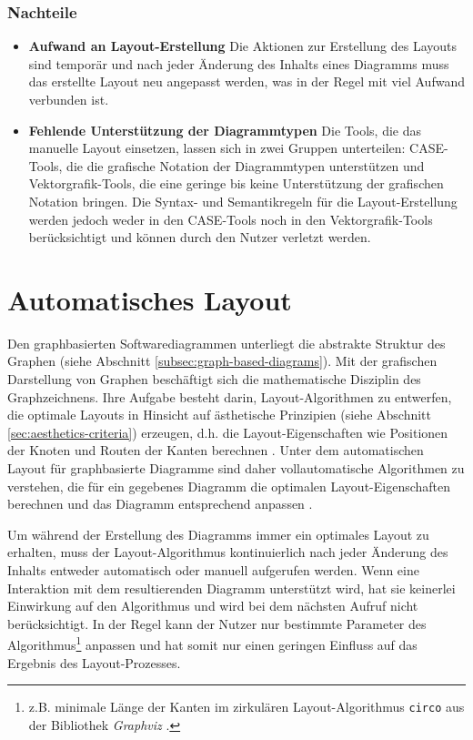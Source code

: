 \subsubsection{Nachteile}

\begin{itemize}

\item
\textbf{Aufwand an Layout-Erstellung}
Die Aktionen zur Erstellung des Layouts sind temporär und nach jeder Änderung des Inhalts eines Diagramms muss das erstellte Layout neu angepasst werden, was in der Regel mit viel Aufwand verbunden ist.

\item
\textbf{Fehlende Unterstützung der Diagrammtypen}
Die Tools, die das manuelle Layout einsetzen, lassen sich in zwei Gruppen unterteilen: CASE-Tools, die die grafische Notation der Diagrammtypen unterstützen und Vektorgrafik-Tools, die eine geringe bis keine Unterstützung der grafischen Notation bringen. Die Syntax- und Semantikregeln für die Layout-Erstellung werden jedoch weder in den CASE-Tools noch in den Vektorgrafik-Tools berücksichtigt und können durch den Nutzer verletzt werden.

\end{itemize}

\section{Automatisches Layout}
\label{sec:automatic-layout}

Den graphbasierten Softwarediagrammen unterliegt die abstrakte Struktur des Graphen (siehe Abschnitt \ref{subsec:graph-based-diagrams}). Mit der grafischen Darstellung von Graphen beschäftigt sich die mathematische Disziplin des Graphzeichnens. Ihre Aufgabe besteht darin, Layout-Algorithmen zu entwerfen, die optimale Layouts in Hinsicht auf ästhetische Prinzipien (siehe Abschnitt \ref{sec:aesthetics-criteria}) erzeugen, d.h. die Layout-Eigenschaften wie Positionen der Knoten und Routen der Kanten berechnen \cite{Eichelberger05Aesthetics, Arvo02Techniques, Siebenhaller03Automatisches, Maier12A-Pattern-based}. Unter dem automatischen Layout für graphbasierte Diagramme sind daher vollautomatische Algorithmen zu verstehen, die für ein gegebenes Diagramm die optimalen Layout-Eigenschaften berechnen und das Diagramm entsprechend anpassen \cite{Fuhrmann11On-the-Pragmatics}.

Um während der Erstellung des Diagramms immer ein optimales Layout zu erhalten, muss der Layout-Algorithmus kontinuierlich nach jeder Änderung des Inhalts entweder automatisch oder manuell aufgerufen werden. Wenn eine Interaktion mit dem resultierenden Diagramm unterstützt wird, hat sie keinerlei Einwirkung auf den Algorithmus und wird bei dem nächsten Aufruf nicht berücksichtigt. In der Regel kann der Nutzer nur bestimmte Parameter des Algorithmus\footnote{z.B. minimale Länge der Kanten im zirkulären Layout-Algorithmus \texttt{circo} aus der Bibliothek \textit{Graphviz} \cite{NorthGansner14Dot-Manual}.} anpassen und hat somit nur einen geringen Einfluss auf das Ergebnis des Layout-Prozesses.

